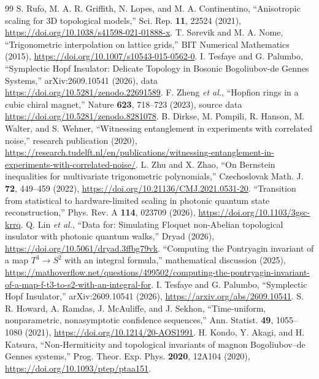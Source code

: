 \documentclass[aps,prd,onecolumn,notitlepage,11pt,superscriptaddress,longbibliography]{revtex4-2}
\begin{document}
\begin{thebibliography}{99}
 S. Rufo, M. A. R. Griffith, N. Lopes, and M. A. Continentino, ``Anisotropic scaling for 3D topological models,'' Sci. Rep. \textbf{11}, 22524 (2021), \url{https://doi.org/10.1038/s41598-021-01888-x}.
 T. S\o{}revik and M. A. Nome, ``Trigonometric interpolation on lattice grids,'' BIT Numerical Mathematics (2015), \url{https://doi.org/10.1007/s10543-015-0562-0}.
 I. Tesfaye and G. Palumbo, ``Symplectic Hopf Insulator: Delicate Topology in Bosonic Bogoliubov-de Gennes Systems,'' arXiv:2609.10541 (2026), data \url{https://doi.org/10.5281/zenodo.22691589}.
 F. Zheng \emph{et al.}, ``Hopfion rings in a cubic chiral magnet,'' Nature \textbf{623}, 718--723 (2023), source data \url{https://doi.org/10.5281/zenodo.8281078}.
 B. Dirkse, M. Pompili, R. Hanson, M. Walter, and S. Wehner, ``Witnessing entanglement in experiments with correlated noise,'' research publication (2020), \url{https://research.tudelft.nl/en/publications/witnessing-entanglement-in-experiments-with-correlated-noise/}.
 L. Zhu and X. Zhao, ``On Bernstein inequalities for multivariate trigonometric polynomials,'' Czechoslovak Math. J. \textbf{72}, 449--459 (2022), \url{https://doi.org/10.21136/CMJ.2021.0531-20}.
 ``Transition from statistical to hardware-limited scaling in photonic quantum state reconstruction,'' Phys. Rev. A \textbf{114}, 023709 (2026), \url{https://doi.org/10.1103/3gsc-krrq}.
 Q. Lin \emph{et al.}, ``Data for: Simulating Floquet non-Abelian topological insulator with photonic quantum walks,'' Dryad (2026), \url{https://doi.org/10.5061/dryad.3ffbg79vk}.
 ``Computing the Pontryagin invariant of a map $T^3\to S^2$ with an integral formula,'' mathematical discussion (2025), \url{https://mathoverflow.net/questions/499502/computing-the-pontryagin-invariant-of-a-map-f-t3-to-s2-with-an-integral-for}.
 I. Tesfaye and G. Palumbo, ``Symplectic Hopf Insulator,'' arXiv:2609.10541 (2026), \url{https://arxiv.org/abs/2609.10541}.
 S. R. Howard, A. Ramdas, J. McAuliffe, and J. Sekhon, ``Time-uniform, nonparametric, nonasymptotic confidence sequences,'' Ann. Statist. \textbf{49}, 1055--1080 (2021), \url{https://doi.org/10.1214/20-AOS1991}.
 H. Kondo, Y. Akagi, and H. Katsura, ``Non-Hermiticity and topological invariants of magnon Bogoliubov--de Gennes systems,'' Prog. Theor. Exp. Phys. \textbf{2020}, 12A104 (2020), \url{https://doi.org/10.1093/ptep/ptaa151}.

\end{thebibliography}
\end{document}
